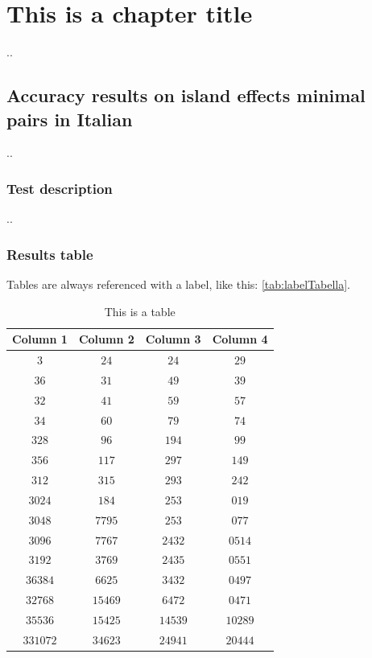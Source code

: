 \chapter{This is a chapter title}

..

\section{Accuracy results on island effects minimal pairs in Italian}

..

\subsection{Test description}

..

\subsection{Results table}


Tables are always referenced with a label, like this: \autoref{tab:labelTabella}.

\begin{table}
	
	\begin{center}
		\begin{tabular}{c|c|c|c}
			\textbf{Column 1} & \textbf{Column 2} & \textbf{Column 3} & \textbf{Column 4} \\
			\hline
			$3$      & $24$     & $24$    & $29$ \\ 
			$36$     & $31$     & $49$    & $39$ \\ 
			$32$     & $41$     & $59$    & $57$ \\ 
			$34$     & $60$     & $79$    & $74$ \\ 
			$328$    & $96$     & $194$   & $99$ \\ 
			$356$    & $117$    & $297$   & $149$ \\ 
			$312$    & $315$    & $293$   & $242$ \\ 
			$3024$   & $184$    & $253$   & $019$ \\ 
			$3048$   & $7795$   & $253$   & $077$ \\ 
			$3096$   & $7767$   & $2432$  & $0514$ \\ 
			$3192$   & $3769$   & $2435$  & $0551$ \\ 
			$36384$  & $6625$   & $3432$  & $0497$ \\ 
			$32768$  & $15469$  & $6472$  & $0471$ \\ 
			$35536$  & $15425$  & $14539$ & $10289$ \\ 
			$331072$ & $34623$  & $24941$ & $20444$ \\  
		\end{tabular}
		\caption{This is a table}\label{tab:labelTabella}
	\end{center}
\end{table}

